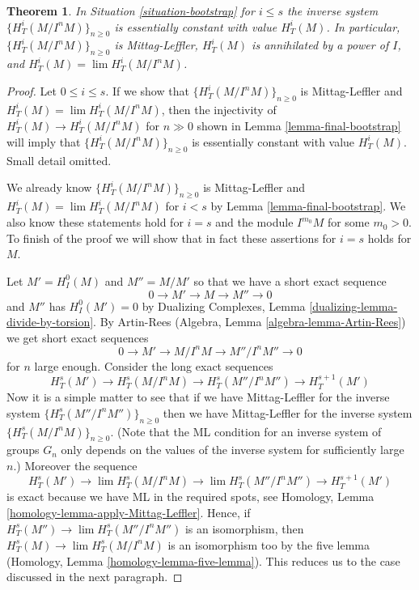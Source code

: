 \documentclass{stacks-project}
\theoremstyle{plain}
\newtheorem{theorem}[subsection]{Theorem}
\theoremstyle{definition}
\theoremstyle{remark}
\numberwithin{equation}{subsection}
\def\lim{\mathop{\mathrm{lim}}\nolimits}
\begin{document}
\begin{theorem}
\label{theorem-final-bootstrap}
In Situation \ref{situation-bootstrap} for $i \leq s$ the inverse system
$\{H^i_T(M/I^nM)\}_{n \geq 0}$ is essentially constant with value $H^i_T(M)$.
In particular, $\{H^i_T(M/I^nM)\}_{n \geq 0}$ is Mittag-Leffler,
$H^i_T(M)$ is annihilated by a power of $I$, and
$H^i_T(M) = \lim H^i_T(M/I^nM)$.
\end{theorem}

\begin{proof}
Let $0 \leq i \leq s$.
If we show that $\{H^i_T(M/I^nM)\}_{n \geq 0}$ is Mittag-Leffler and
$H^i_T(M) = \lim H^i_T(M/I^nM)$, then the injectivity of
$H^i_T(M) \to H^i_T(M/I^nM)$ for $n \gg 0$ shown in
Lemma \ref{lemma-final-bootstrap} will imply that
$\{H^i_T(M/I^nM)\}_{n \geq 0}$ is essentially constant with value $H^i_T(M)$.
Small detail omitted.

\medskip\noindent
We already know $\{H^i_T(M/I^nM)\}_{n \geq 0}$ is Mittag-Leffler and
$H^i_T(M) = \lim H^i_T(M/I^nM)$ for $i < s$ by
Lemma \ref{lemma-final-bootstrap}. We also know these statements hold
for $i = s$ and the module $I^{m_0}M$ for some $m_0 > 0$.
To finish of the proof we will show that in fact these
assertions for $i = s$ holds for $M$.

\medskip\noindent
Let $M' = H^0_I(M)$ and $M'' = M/M'$ so that we have a short exact
sequence
$$
0 \to M' \to M \to M'' \to 0
$$
and $M''$ has $H^0_I(M') = 0$ by
Dualizing Complexes, Lemma \ref{dualizing-lemma-divide-by-torsion}.
By Artin-Rees (Algebra, Lemma \ref{algebra-lemma-Artin-Rees})
we get short exact sequences
$$
0 \to M' \to M/I^n M \to M''/I^n M'' \to 0
$$
for $n$ large enough. Consider the long exact sequences
$$
H^s_T(M') \to
H^s_T(M/I^nM) \to
H^s_T(M''/I^nM'') \to
H^{s + 1}_T(M')
$$
Now it is a simple matter to see that if we have Mittag-Leffler
for the inverse system $\{H^s_T(M''/I^nM'')\}_{n \geq 0}$
then we have Mittag-Leffler for the inverse system
$\{H^s_T(M/I^nM)\}_{n \geq 0}$.
(Note that the ML condition for an inverse system of groups $G_n$
only depends on the values of the inverse system for sufficiently large $n$.)
Moreover the sequence
$$
H^s_T(M') \to
\lim H^s_T(M/I^nM) \to
\lim H^s_T(M''/I^nM'') \to
H^{s + 1}_T(M')
$$
is exact because we have ML in the required spots, see
Homology, Lemma \ref{homology-lemma-apply-Mittag-Leffler}.
Hence, if $H^s_T(M'') \to \lim H^s_T(M''/I^nM'')$
is an isomorphism, then
$H^s_T(M) \to \lim H^s_T(M/I^nM)$
is an isomorphism too by the five lemma
(Homology, Lemma \ref{homology-lemma-five-lemma}).
This reduces us to the case discussed in the next paragraph.


\end{proof}
\end{document}
